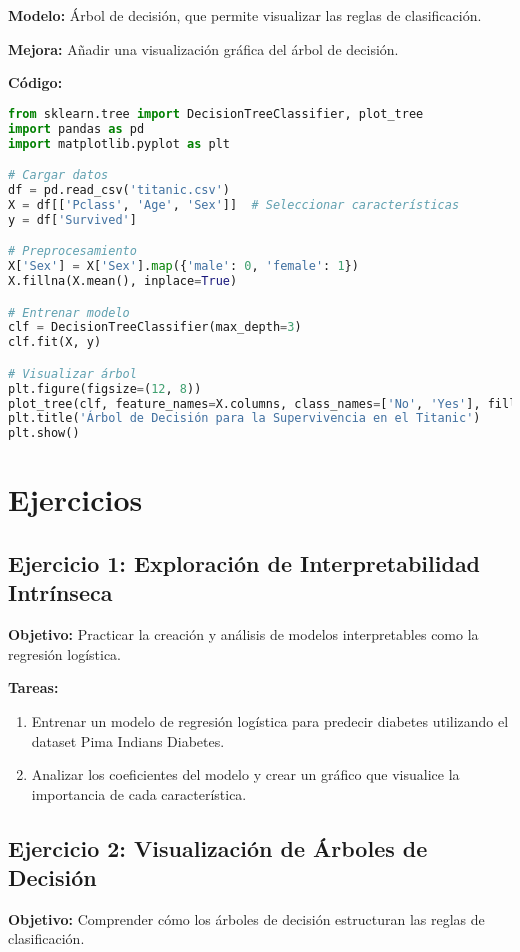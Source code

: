 \begin{refsection}
\textbf{Modelo:} Árbol de decisión, que permite visualizar las reglas de clasificación.

\textbf{Mejora:} Añadir una visualización gráfica del árbol de decisión.

\textbf{Código:}
\begin{lstlisting}[language=Python]
from sklearn.tree import DecisionTreeClassifier, plot_tree
import pandas as pd
import matplotlib.pyplot as plt

# Cargar datos
df = pd.read_csv('titanic.csv')
X = df[['Pclass', 'Age', 'Sex']]  # Seleccionar características
y = df['Survived']

# Preprocesamiento
X['Sex'] = X['Sex'].map({'male': 0, 'female': 1})
X.fillna(X.mean(), inplace=True)

# Entrenar modelo
clf = DecisionTreeClassifier(max_depth=3)
clf.fit(X, y)

# Visualizar árbol
plt.figure(figsize=(12, 8))
plot_tree(clf, feature_names=X.columns, class_names=['No', 'Yes'], filled=True)
plt.title('Árbol de Decisión para la Supervivencia en el Titanic')
plt.show()
\end{lstlisting}

\section{Ejercicios}
\subsection{Ejercicio 1: Exploración de Interpretabilidad Intrínseca}
\textbf{Objetivo:} Practicar la creación y análisis de modelos interpretables como la regresión logística.

\textbf{Tareas:}
\begin{enumerate}
    \item Entrenar un modelo de regresión logística para predecir diabetes utilizando el dataset Pima Indians Diabetes.
    \item Analizar los coeficientes del modelo y crear un gráfico que visualice la importancia de cada característica.
\end{enumerate}

\subsection{Ejercicio 2: Visualización de Árboles de Decisión}
\textbf{Objetivo:} Comprender cómo los árboles de decisión estructuran las reglas de clasificación.


\end{refsection}
